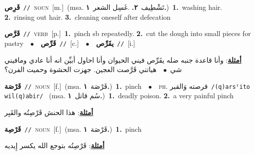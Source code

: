 \documentclass[10pt,a4paper,twoside]{article} %
\begin{document}
\begin{multicols}{2}
{\setlength\topsep{0pt}\textbf{\foreignlanguage{arabic}{قَرِص}}\ {\color{gray}\texttt{//}\color{black}}\ \textsc{noun}\ [m.]\ \color{gray}(msa. \foreignlanguage{arabic}{تَشْطِيف}~\foreignlanguage{arabic}{\textbf{٢.}}  .\foreignlanguage{arabic}{غَسِل الشعر}~\foreignlanguage{arabic}{\textbf{١.}})\color{black}\ \textbf{1.}~washing hair.  \textbf{2.}~rinsing out hair.  \textbf{3.}~cleaning oneself after defecation\ } \vspace{2mm}

{\setlength\topsep{0pt}\textbf{\foreignlanguage{arabic}{قَرَّص}}\ {\color{gray}\texttt{//}\color{black}}\ \textsc{verb}\ [p.]\ \textbf{1.}~pinch sb repeatedly.  \textbf{2.}~cut the dough into small pieces for pastry\ \ $\bullet$\ \ \setlength\topsep{0pt}\textbf{\foreignlanguage{arabic}{قَرِّص}}\ {\color{gray}\texttt{//}\color{black}}\ [c.]\ \ $\bullet$\ \ \setlength\topsep{0pt}\textbf{\foreignlanguage{arabic}{يقَرِّص}}\ {\color{gray}\texttt{//}\color{black}}\ [i.]\  \begin{flushright}\color{gray}\foreignlanguage{arabic}{\textbf{\underline{\foreignlanguage{arabic}{أمثلة}}}: وأنا قاعدة جنبه ضله يقَرِّص فيني الحيوان وأنا احاول أبيِّن انه أنا عادي ومافيني شي\ $\bullet$\ \  هياتني قَرَّصت العجين. جهزت الحشوة وحميت الفرن؟}\end{flushright}\color{black}} \vspace{2mm}

{\setlength\topsep{0pt}\textbf{\foreignlanguage{arabic}{قَرْصَة}}\ {\color{gray}\texttt{//}\color{black}}\ \textsc{noun}\ [f.]\ \color{gray}(msa. \foreignlanguage{arabic}{قَرْصَة}~\foreignlanguage{arabic}{\textbf{١.}})\color{black}\ \textbf{1.}~pinch\ \ $\bullet$\ \ \textsc{ph.} \color{gray} \foreignlanguage{arabic}{قرصته وَالقبر}\color{black}\ {\color{gray}\texttt{/{\sffamily (q)arsˤito wil(q)abir}/}\color{black}}\ \color{gray} (msa. \foreignlanguage{arabic}{سُم قاتل}~\foreignlanguage{arabic}{\textbf{١.}})\color{black}\ \textbf{1.}~deadly poison.  \textbf{2.}~a very painful pinch\  \begin{flushright}\color{gray}\foreignlanguage{arabic}{\textbf{\underline{\foreignlanguage{arabic}{أمثلة}}}: هذا الحنش قَرْصِتُه والقَبِر}\end{flushright}\color{black}} \vspace{2mm}

{\setlength\topsep{0pt}\textbf{\foreignlanguage{arabic}{قَرْصِة}}\ {\color{gray}\texttt{//}\color{black}}\ \textsc{noun}\ [f.]\ \color{gray}(msa. \foreignlanguage{arabic}{قَرْصَة}~\foreignlanguage{arabic}{\textbf{١.}})\color{black}\ \textbf{1.}~pinch\  \begin{flushright}\color{gray}\foreignlanguage{arabic}{\textbf{\underline{\foreignlanguage{arabic}{أمثلة}}}: قَرْصِتُه بتوجع الله يكسر إِيديه}\end{flushright}\color{black}} \vspace{2mm}


\end{multicols}
\end{document}
